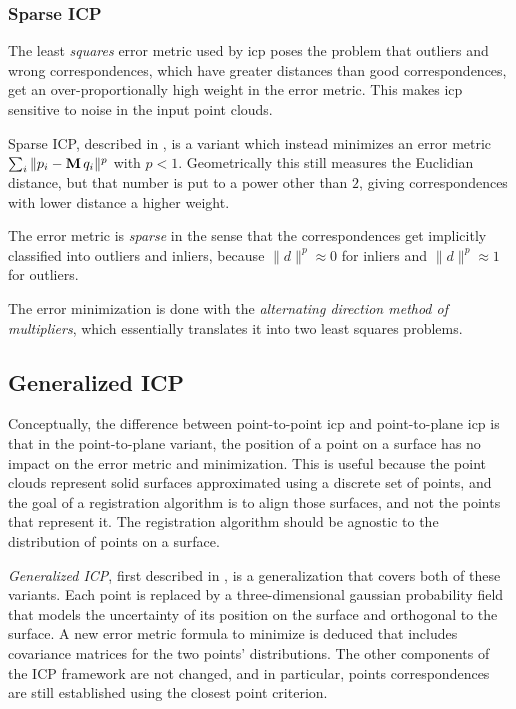 \subsubsection{Sparse ICP}
The least \emph{squares} error metric used by \gls{icp} poses the problem that outliers and wrong correspondences, which have greater distances than good correspondences, get an over-proportionally high weight in the error metric. This makes \gls{icp} sensitive to noise in the input point clouds.

Sparse ICP, described in \cite{Boua2013}, is a variant which instead minimizes an error metric $\sum_i \| p_i - \mathbf{M} \, q_i \|^p$ with $p < 1$. Geometrically this still measures the Euclidian distance, but that number is put to a power other than $2$, giving correspondences with lower distance a higher weight.

The error metric is \emph{sparse} in the sense that the correspondences get implicitly classified into outliers and inliers, because $\|d\|^p \approx 0$ for inliers and $\|d\|^p \approx 1$ for outliers.

The error minimization is done with the \emph{alternating direction method of multipliers}, which essentially translates it into two least squares problems.



\subsection{Generalized ICP}
Conceptually, the difference between point-to-point \gls{icp} and point-to-plane \gls{icp} is that in the point-to-plane variant, the position of a point on a surface has no impact on the error metric and minimization. This is useful because the point clouds represent solid surfaces approximated using a discrete set of points, and the goal of a registration algorithm is to align those surfaces, and not the points that represent it. The registration algorithm should be agnostic to the distribution of points on a surface.

\emph{Generalized ICP}, first described in \cite{Sega2009}, is a generalization that covers both of these variants. Each point is replaced by a three-dimensional gaussian probability field that models the uncertainty of its position on the surface and orthogonal to the surface. A new error metric formula to minimize is deduced that includes covariance matrices for the two points' distributions. The other components of the ICP framework are not changed, and in particular, points correspondences are still established using the closest point criterion.

